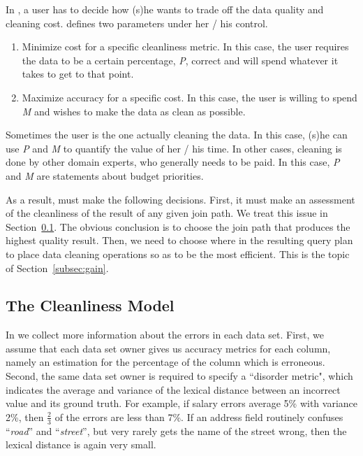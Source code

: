 In \dcv, a user has to decide how (s)he wants to trade off the data quality and cleaning cost. \dcv defines two parameters under her / his control.

\begin{enumerate}
\item Minimize cost for a specific cleanliness metric. In this case, the user requires the data to be a certain percentage, \emph{P}, correct and will spend whatever it takes to get to that point.

\item Maximize accuracy for a specific cost. In this case, the user is willing to spend \emph{M} and wishes to make the data as clean as possible.
\end{enumerate}


Sometimes the user is the one actually cleaning the data. In this case, (s)he can use \emph{P} and \emph{M} to quantify the value of her / his time. In other cases, cleaning is done by other domain experts, who generally needs to be paid. In this case, \emph{P} and \emph{M} are statements about budget priorities.



As a result, \dcv must make the following decisions.  First, it must make an assessment of the cleanliness of the result of any given join path.  We treat this issue in Section~\ref{subsec:model}. The obvious conclusion is to choose the join path that produces the highest quality result.
Then, we need to choose where in the resulting query plan to place data cleaning operations so as to be the most efficient.  This is the topic of Section~\ref{subsec:gain}.


\subsection{The Cleanliness Model}
\label{subsec:model}



In \dcv we collect more information about the errors in each data set. First, we assume that each data set owner gives us accuracy metrics for each column, namely an estimation for the percentage of the column which is erroneous. Second, the same data set owner is required to specify a ``disorder metric", which indicates the average and variance of the lexical distance between an incorrect value and its ground truth.  For example, if salary errors average 5\% with variance 2\%, then $\frac{2}{3}$ of the errors are less than 7\%. If an address field routinely confuses ``\textit{road}'' and ``\textit{street}'', but very rarely gets the name of the street wrong, then the lexical distance is again very small.




